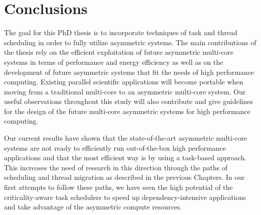 \chapter{Conclusions}

The goal for this PhD thesis is to incorporate techniques of task and thread scheduling in order to fully utilize asymmetric systems.
The main contributions of the thesis rely on the efficient exploitation of future asymmetric multi-core systems in terms of performance and energy efficiency as well as on the development of future asymmetric systems that fit the needs of high performance computing.
Existing parallel scientific applications will become portable when moving from a traditional multi-core to an asymmetric multi-core system. 
Our useful observations throughout this study will also contribute and give guidelines for the design of the future multi-core asymmetric systems for high performance computing.



Our current results have shown that the state-of-the-art asymmetric multi-core systems are not ready to efficiently run out-of-the-box high performance applications and that the most efficient way is by using a task-based approach.
This increases the need of research in this direction through the paths of scheduling and thread migration as described in the previous Chapters.
In our first attempts to follow these paths, we have seen the high potential of the criticality-aware task schedulers to speed up dependency-intensive applications and take advantage of the asymmetric compute resources.

